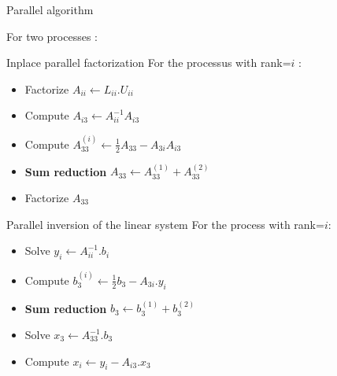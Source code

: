 \documentclass[compress,10pt,aspectratio=169]{beamer}
\begin{document}
\begin{frame}[fragile]{Parallel algorithm}

  For two processes :
  \scriptsize

  \begin{multicols}{2}
   \begin{exampleblock}{\small Inplace parallel factorization}
    For the processus with rank=$i$ :
    \begin{itemize}
      \item Factorize $A_{ii} \leftarrow L_{ii}.U_{ii}$
      \item Compute $A_{i3} \leftarrow A_{ii}^{-1}A_{i3}$
      \item Compute $A_{33}^{(i)} \leftarrow \frac{1}{2}A_{33} - A_{3i}A_{i3}$
      \item \textbf{Sum reduction} $A_{33} \leftarrow A_{33}^{(1)} + A_{33}^{(2)}$
      \item Factorize $A_{33}$
    \end{itemize}
   \end{exampleblock}

   \begin{alertblock}{\small Parallel inversion of the linear system}
    For the process with rank=$i$:
    \begin{itemize}
      \item Solve $y_{i} \leftarrow A_{ii}^{-1}.b_{i}$
      \item Compute $b_{3}^{(i)} \leftarrow \frac{1}{2}b_{3} - A_{3i}.y_{i}$
      \item \textbf{Sum reduction} $b_{3} \leftarrow b_{3}^{(1)} + b_{3}^{(2)}$
      \item Solve $x_{3} \leftarrow A_{33}^{-1}.b_{3}$
      \item Compute $x_{i} \leftarrow y_{i} - A_{i3}.x_{3}$
    \end{itemize}
   \end{alertblock}
  \end{multicols}
\end{frame}
\end{document}

